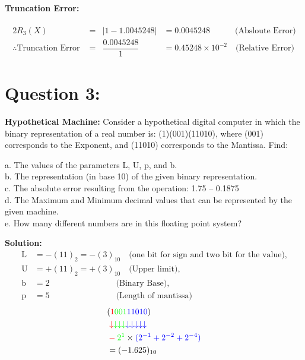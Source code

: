 \documentclass[a4paper,12pt]{article}
\begin{document}
\paragraph*{\Large Truncation Error:}
	\begin{alignat*}{2}
		R_3(X)&=& |1-1.0045248|  &= 0.0045248 \quad \qquad  \text{(Absloute Error)} \\
		\therefore \text{Truncation Error }&=& \dfrac{0.0045248}{1} &= 0.45248\times 10^{-2} \quad \text{(Relative Error)}
	\end{alignat*}

\newpage




\section*{\LARGE Question 3:}
 \textbf {\Large Hypothetical Machine:}
 Consider a hypothetical digital computer in which the binary representation of a real number is: (1)(001)(11010), where (001)
corresponds to the Exponent, and (11010) corresponds to the Mantissa. Find:
 \begin{flushleft}
a. The values of the parameters L, U, p, and b.\\
b. The representation (in base 10) of the given binary representation.\\
c. The absolute error resulting from the operation: 1.75 – 0.1875\\
d. The Maximum and Minimum decimal values that can be represented by the given machine.\\
e. How many different numbers are in this floating point system?
 \end{flushleft}
 {\color{blue}\textbf{Solution: \\}}
 \begin{align*}
 \text{L} &= -(11)_2 =-(3)_{10} \quad \text{(one bit for sign and two bit for the value),} \\
 \text{U} &= +(11)_2 =+(3)_{10} \quad \text{(Upper limit)},\\
 \text{b} &= 2 \qquad \qquad \qquad \qquad \text{(Binary Base)},\\
 \text{p} &= 5 \qquad \qquad \qquad \qquad \text{(Length of mantissa)}
 \end{align*} 
 \begin{alignat*}{3}
 &(\color{red}1\color{green}001\color{blue}11010\color{black})\\
 &\color{red}\downarrow\color{green}\downarrow\downarrow\downarrow\color{blue}\downarrow\downarrow\downarrow\downarrow\downarrow\\
 &\color{red}-\color{green}2^{1}\color{black}\times\color{blue}(2^{-1}+2^{-2}+2^{-4})\color{blue}\\
 &=(-1.625)_{10}
 \end{alignat*}
\end{document}
